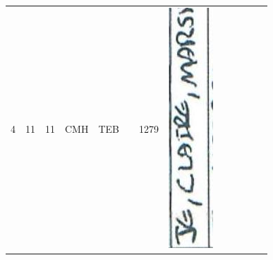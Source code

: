 \documentclass[10pt]{article}
\begin{document}
\begin{center}
\begin{tabular}{|c|c|c|c|c|c|c|c|c|c|c|c|c|}
4 & 11 & 11 & CMH & TEB &  & 1279 & \includegraphics[max width=\textwidth]{2025_02_27_dd68c3d38de88f0516d9g-073}

\end{tabular}
\end{center}
\end{document}
